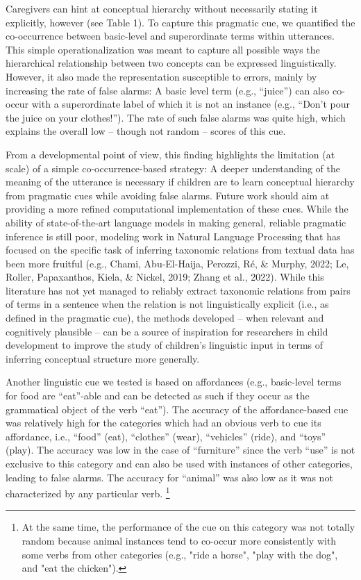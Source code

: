 \documentclass[english,,man]{apa6}
\let\rmarkdownfootnote\footnote%
\def\footnote{\protect\rmarkdownfootnote}
\begin{document}
Caregivers can hint at conceptual hierarchy without necessarily stating it explicitly, however (see Table 1). To capture this pragmatic cue, we quantified the co-occurrence between basic-level and superordinate terms within utterances. This simple operationalization was meant to capture all possible ways the hierarchical relationship between two concepts can be expressed linguistically. However, it also made the representation susceptible to errors, mainly by increasing the rate of false alarms: A basic level term (e.g., \enquote{juice}) can also co-occur with a superordinate label of which it is not an instance (e.g., \enquote{Don't pour the juice on your clothes!}). The rate of such false alarms was quite high, which explains the overall low -- though not random -- scores of this cue.

From a developmental point of view, this finding highlights the limitation (at scale) of a simple co-occurrence-based strategy: A deeper understanding of the meaning of the utterance is necessary if children are to learn conceptual hierarchy from pragmatic cues while avoiding false alarms. Future work should aim at providing a more refined computational implementation of these cues. While the ability of state-of-the-art language models in making general, reliable pragmatic inference is still poor, modeling work in Natural Language Processing that has focused on the specific task of inferring taxonomic relations from textual data has been more fruitful (e.g., Chami, Abu-El-Haija, Perozzi, Ré, \& Murphy, 2022; Le, Roller, Papaxanthos, Kiela, \& Nickel, 2019; Zhang et al., 2022). While this literature has not yet managed to reliably extract taxonomic relations from pairs of terms in a sentence when the relation is not linguistically explicit (i.e., as defined in the pragmatic cue), the methods developed -- when relevant and cognitively plausible -- can be a source of inspiration for researchers in child development to improve the study of children's linguistic input in terms of inferring conceptual structure more generally.

Another linguistic cue we tested is based on affordances (e.g., basic-level terms for food are \enquote{eat}-able and can be detected as such if they occur as the grammatical object of the verb \enquote{eat}). The accuracy of the affordance-based cue was relatively high for the categories which had an obvious verb to cue its affordance, i.e., \enquote{food} (eat), \enquote{clothes} (wear), \enquote{vehicles} (ride), and \enquote{toys} (play). The accuracy was low in the case of \enquote{furniture} since the verb \enquote{use} is not exclusive to this category and can also be used with instances of other categories, leading to false alarms. The accuracy for \enquote{animal} was also low as it was not characterized by any particular verb. \footnote{At the same time, the performance of the cue on this category was not totally random because animal instances tend to co-occur more consistently with some verbs from other categories (e.g., "ride a horse", "play with the dog", and "eat the chicken").}
\end{document}
